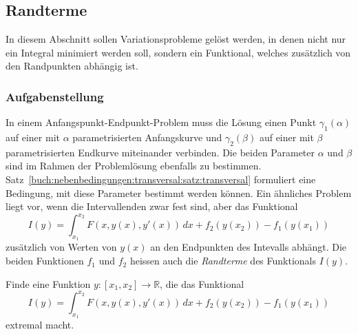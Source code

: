 %
%
\subsection{Randterme
\label{buch:nebenbedingungen:transversal:subsection:randterme}}
In diesem Abschnitt sollen Variationsprobleme gelöst werden, in denen
nicht nur ein Integral minimiert werden soll, sondern ein Funktional,
welches zusätzlich von den Randpunkten abhängig ist.

%
%
\subsubsection{Aufgabenstellung}
In einem Anfangspunkt-Endpunkt-Problem muss die Lösung einen Punkt
$\gamma_1(\alpha)$ auf einer mit $\alpha$ parametrisierten Anfangskurve
und $\gamma_2(\beta)$ auf einer mit $\beta$ parametrisierten Endkurve
miteinander verbinden.
Die beiden Parameter $\alpha$ und $\beta$ sind im Rahmen der Problemlösung
ebenfalls zu bestimmen.
Satz~\ref{buch:nebenbedingungen:transversal:satz:transversal}
formuliert eine Bedingung, mit diese Parameter bestimmt werden können.
Ein ähnliches Problem liegt vor, wenn die Intervallenden zwar fest sind,
aber das Funktional
\[
I(y)
=
\int_{x_1}^{x_2}
F(x,y(x),y'(x))
\,dx
+
f_2(y(x_2))
-
f_1(y(x_1))
\]
zusätzlich von Werten von $y(x)$ an den Endpunkten des Intevalls
abhängt.
Die beiden Funktionen $f_1$ und $f_2$ heissen auch die {\em Randterme}
%
des Funktionals $I(y)$.

\begin{aufgabe}
\label{buch:nebenbedingungen:transversal:aufgabe:randterme}
Finde eine Funktion $y\colon[x_1,x_2]\to\mathbb{R}$, die das Funktional
\begin{equation}
I(y)
=
\int_{x_1}^{x_2}
F(x,y(x),y'(x))\,dx
+
f_2(y(x_2))
-
f_1(y(x_1))
\label{buch:nebenbedingungen:transversal:eqn:randterme}
\end{equation}
extremal macht.
\end{aufgabe}

%
%
